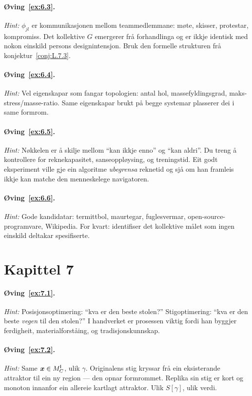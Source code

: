 \paragraph{Øving~\ref{ex:6.3}.}
\emph{Hint:} $\phi_{jl}$ er kommunikasjonen mellom
teammedlemmane: møte, skisser, protestar, kompromiss. Det
kollektive $G$ emergerer frå forhandlinga og er ikkje identisk med
nokon einskild persons designintensjon. Bruk den formelle
strukturen frå konjektur~\ref{conj:L.7.3}.

\paragraph{Øving~\ref{ex:6.4}.}
\emph{Hint:} Vel eigenskapar som fangar topologien: antal hol,
massefyldingsgrad, maks-stress/masse-ratio. Same eigenskapar
brukt på begge systemar plasserer dei i same formrom.

\paragraph{Øving~\ref{ex:6.5}.}
\emph{Hint:} Nøkkelen er å skilje mellom ``kan ikkje enno'' og
``kan aldri''. Du treng å kontrollere for reknekapasitet,
sanseoppløysing, og treningstid. Eit godt eksperiment ville gje
ein algoritme \emph{ubegrensa} reknetid og sjå om han framleis
ikkje kan matche den menneskelege navigatoren.

\paragraph{Øving~\ref{ex:6.6}.}
\emph{Hint:} Gode kandidatar: termittbol, maurtegar,
fuglesvermar, open-source-programvare, Wikipedia. For kvart:
identifiser det kollektive målet som ingen einskild deltakar
spesifiserte.


\section*{Kapittel 7}

\paragraph{Øving~\ref{ex:7.1}.}
\emph{Hint:} Posisjonsoptimering: ``kva er den beste stolen?''
Stigoptimering: ``kva er den beste \emph{vegen} til den
stolen?'' I handverket er prosessen viktig fordi han byggjer
ferdigheit, materialforståing, og tradisjonskunnskap.

\paragraph{Øving~\ref{ex:7.2}.}
\emph{Hint:} Same $\bm{x} \in M^{\mathsf{I}}_C$, ulik $\gamma$. Originalens
stig kryssar frå ein eksisterande attraktor til ein ny region ---
den opnar formrommet. Replika sin stig er kort og monoton innanfor
ein allereie kartlagt attraktor. Ulik $S[\gamma]$, ulik verdi.

